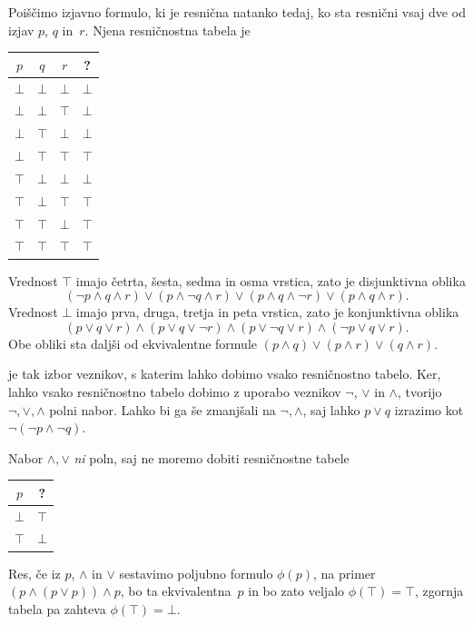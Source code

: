 \begin{zgled}
  Poiščimo izjavno formulo, ki je resnična natanko tedaj, ko sta resnični vsaj dve od izjav $p$, $q$ in~$r$.
  Njena resničnostna tabela je
  \begin{center}
    \small
    \begin{tabular}{cccc}
      \toprule
      $p$ & $q$ & $r$ & ? \\
      \midrule
      $\bot$ & $\bot$ & $\bot$ & $\bot$ \\
      $\bot$ & $\bot$ & $\top$ & $\bot$ \\
      $\bot$ & $\top$ & $\bot$ & $\bot$ \\
      $\bot$ & $\top$ & $\top$ & $\top$ \\
      $\top$ & $\bot$ & $\bot$ & $\bot$ \\
      $\top$ & $\bot$ & $\top$ & $\top$ \\
      $\top$ & $\top$ & $\bot$ & $\top$ \\
      $\top$ & $\top$ & $\top$ & $\top$ \\
      \bottomrule
    \end{tabular}
  \end{center}
  Vrednost $\top$ imajo četrta, šesta, sedma in osma vrstica, zato je disjunktivna oblika
  \begin{equation*}
    (\neg p \land q \land r) \lor (p \land \neg q \land r) \lor (p \land q \land \neg r) \lor (p \land q \land r).
  \end{equation*}
  Vrednost $\bot$ imajo prva, druga, tretja in peta vrstica, zato je konjunktivna oblika
  \begin{equation*}
    (p \lor q \lor r) \land (p \lor q \lor \neg r) \land (p \lor \neg q \lor r) \land (\neg p \lor q \lor r).
  \end{equation*}
  Obe obliki sta daljši od ekvivalentne formule $(p \land q) \lor (p \land r) \lor (q \land r)$.
\end{zgled}

 je tak izbor veznikov, s katerim lahko dobimo vsako
resničnostno tabelo. Ker, lahko vsako resničnostno tabelo dobimo z uporabo veznikov $\neg$, $\lor$ in $\land$, tvorijo ${\neg}, {\lor}, {\land}$ polni nabor.
%
Lahko bi ga še zmanjšali na ${\neg}, {\land}$, saj lahko $p \lor q$ izrazimo kot $\neg(\neg p \land \neg q)$.

\begin{zgled}
Nabor ${\land}, {\lor}$ \emph{ni} poln, saj ne moremo dobiti resničnostne tabele
%
\begin{center}
  \begin{tabular}{cc}
    \toprule
    $p$ & ? \\ \midrule
    $\bot$ & $\top$ \\
    $\top$ & $\bot$ \\
    \bottomrule
  \end{tabular}
\end{center}
%
Res, če iz $p$, $\land$ in $\lor$ sestavimo poljubno formulo $\phi(p)$, na primer $(p \land (p \lor p)) \land p$, bo ta ekvivalentna~$p$ in bo zato veljalo $\phi(\top) = \top$, zgornja tabela pa zahteva $\phi(\top) = \bot$.
\end{zgled}


